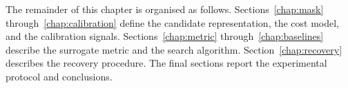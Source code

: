 The remainder of this chapter is organised as follows. Sections~\ref{chap:mask} through~\ref{chap:calibration} define the candidate representation, the cost model, and the calibration signals. Sections~\ref{chap:metric} through~\ref{chap:baselines} describe the surrogate metric and the search algorithm. Section~\ref{chap:recovery} describes the recovery procedure. The final sections report the experimental protocol and conclusions.

